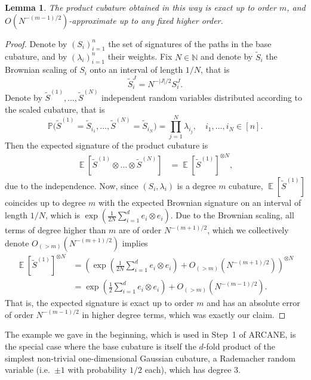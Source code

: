 \documentclass[11pt, letterpaper]{article}
\newtheorem{lemma}{Lemma}
\theoremstyle{definition}
\theoremstyle{remark}
\DeclareMathOperator{\E}{\mathbb{E}}
\renewcommand{\P}{\mathbb{P}}
\newcommand{\N}{\mathbb{N}}
\renewcommand{\P}{\mathbb{P}}
\newcommand{\short}{ARCANE\xspace}
\begin{document}
\begin{appendices}
\begin{lemma}\label{lem:product-cubature}
    The product cubature obtained in this way is exact up to order $m$, and $O(N^{-(m-1)/2})$-approximate up to any fixed higher order.
\end{lemma}
\begin{proof}
    Denote by $(S_i)_{i=1}^n$ the set of signatures of the paths in the base cubature, and by $(\lambda_i)_{i=1}^n$ their weights. Fix $N\in \N$ and denote by $\tilde{S}_i$ the Brownian scaling of $S_i$ onto an interval of length $1 / N$, that is \[
    \tilde{S}_i^J = N^{-|J|/2} S_i^J.
    \] Denote by $\tilde{S}^{(1)},\ldots,\tilde{S}^{(N)}$ independent random variables distributed according to the scaled cubature, that is \[
    \P\Big(\tilde{S}^{(1)} = \tilde{S}_{i_1},\ldots , \tilde{S}^{(N)} = \tilde{S}_{i_N}\Big) = \prod_{j=1}^N \lambda_{i_j},\quad i_1,\ldots,i_N \in [n].
    \]
    Then the expected signature of the product cubature is 
    \begin{align*}
    \E\left[ \tilde{S}^{(1)} \otimes \ldots \otimes \tilde{S}^{(N)} \right]
    &= \E\left[ \tilde{S}^{(1)}\right]^{\otimes N},
    \end{align*}
    due to the independence. Now, since $(S_i,\lambda_i)$ is a degree $m$ cubature, $\E[\tilde{S}^{(1)}]$ coincides up to degree $m$ with the expected Brownian signature on an interval of length $1/N$, which is $\exp \left( \frac{1}{2N} \sum_{i=1}^d e_i \otimes e_i\right)$. Due to the Brownian scaling, all terms of degree higher than $m$ are of order $N^{-(m+1)/2}$, which we collectively denote $O_{(> m)}(N^{-(m+1)/2})$ implies 
    \begin{align*}
        \E \left[ \tilde{S}^{(1)}\right]^{\otimes N} 
        &= \left( \exp \left( \frac{1}{2N} \sum_{i=1}^d e_i \otimes e_i\right) + O_{(>m)}(N^{-(m+1)/2}) \right)^{\otimes N}\\
        &= \exp \left( \frac 12 \sum_{i=1}^d e_i \otimes e_i\right) + O_{(>m)} \left( N^{-(m-1)/2}\right).
    \end{align*}
    That is, the expected signature is exact up to order $m$ and has an absolute error of order $N^{-(m-1)/2}$ in higher degree terms, which was exactly our claim.
\end{proof}

The example we gave in the beginning, which is used in Step~1 of \short, is the special case where the base cubature is itself the $d$-fold product of the simplest non-trivial one-dimensional Gaussian cubature, a Rademacher random variable (i.e.\ $\pm 1$ with probability $1/2$ each), which has degree $3$.


\end{appendices}
\end{document}
